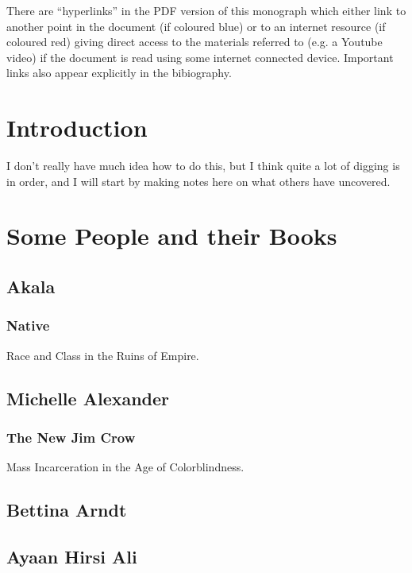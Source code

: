 \documentclass[10pt,titlepage]{book}
\begin{document}

There are ``hyperlinks'' in the PDF version of this monograph which either link to another point in the document  (if coloured blue) or to an internet resource  (if coloured red) giving direct access to the materials referred to (e.g. a Youtube video) if the document is read using some internet connected device.
Important links also appear explicitly in the bibiography.

\chapter{Introduction}

I don't really have much idea how to do this, but I think quite a lot of digging is in order, and I will start by making notes here on what others have uncovered.

\chapter{Some People and their Books}

\section{Akala}

\subsection{Native\cite{akala-native}}

Race and Class in the Ruins of Empire.

\section{Michelle Alexander}

\subsection{The New Jim Crow\cite{alexander-tnjc}}
Mass Incarceration in the Age of Colorblindness.

\section{Bettina Arndt \cite{arndt-home}}

\section{Ayaan Hirsi Ali}
\end{document}
